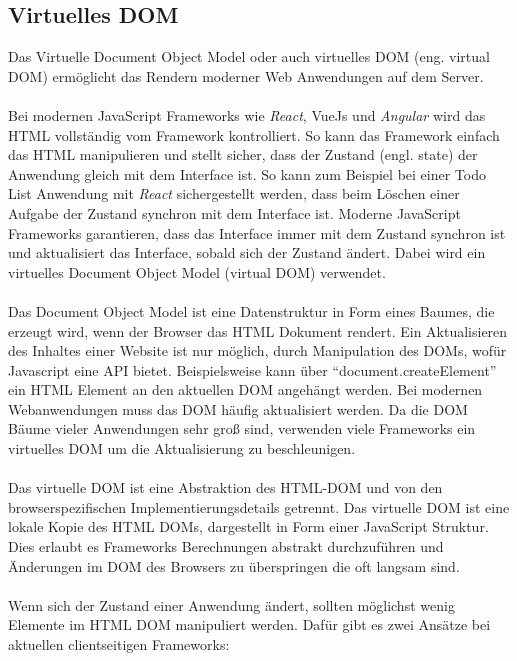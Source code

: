 \documentclass[runningheads]{llncs}
\numberwithin{figure}{section}
\begin{document}
\subsection{Virtuelles DOM}
\label{subsec:Virtuelles DOM}
Das Virtuelle Document Object Model
oder auch virtuelles DOM (eng. virtual DOM) ermöglicht 
das Rendern moderner Web Anwendungen auf dem Server.
\\
\\
Bei modernen JavaScript Frameworks wie \textit{React}, 
VueJs und \textit{Angular} wird das HTML vollständig vom Framework kontrolliert. 
So kann das Framework einfach das HTML manipulieren und stellt sicher, 
dass der Zustand (engl. state) der Anwendung gleich mit dem Interface ist. 
So kann zum Beispiel bei einer Todo List Anwendung mit \textit{React} sichergestellt werden, 
dass beim Löschen einer Aufgabe der Zustand synchron mit dem Interface ist. 
Moderne JavaScript Frameworks garantieren, 
dass das Interface immer mit dem Zustand synchron ist und aktualisiert das Interface, 
sobald sich der Zustand ändert. 
Dabei wird ein virtuelles Document Object Model (virtual DOM) verwendet.
\\
\\
Das Document Object Model ist eine Datenstruktur in Form eines Baumes, 
die erzeugt wird, wenn der Browser das HTML Dokument rendert. 
Ein Aktualisieren des Inhaltes einer Website ist nur möglich, 
durch Manipulation des DOMs, wofür Javascript eine API bietet. 
Beispielsweise kann über “document.createElement” ein HTML Element 
an den aktuellen DOM angehängt werden. 
Bei modernen Webanwendungen muss das DOM häufig aktualisiert werden. 
Da die DOM Bäume vieler Anwendungen sehr groß sind, 
verwenden viele Frameworks ein virtuelles DOM um die 
Aktualisierung zu beschleunigen. 
\\
\\
Das virtuelle DOM ist eine Abstraktion des HTML-DOM und 
von den browserspezifischen Implementierungsdetails getrennt. 
Das virtuelle DOM ist eine lokale Kopie des HTML DOMs, 
dargestellt in Form einer JavaScript Struktur. 
Dies erlaubt es Frameworks
Berechnungen abstrakt durchzuführen und Änderungen im DOM des Browsers 
zu überspringen die oft langsam sind.
\\
\\
Wenn sich der Zustand einer Anwendung ändert, 
sollten möglichst wenig Elemente im HTML DOM manipuliert werden. 
Dafür gibt es zwei Ansätze bei aktuellen clientseitigen Frameworks:
\end{document}
